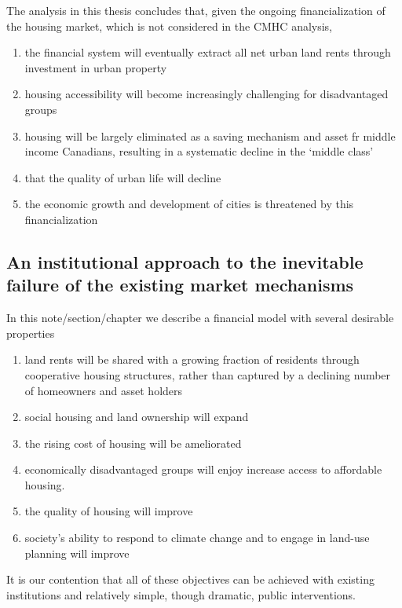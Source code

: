 The analysis in this thesis concludes that, given the ongoing financialization of the housing market, which is not considered in the CMHC analysis,

\begin{enumerate}
\item the financial system will eventually extract all net urban land rents through investment in urban property
\item housing accessibility will become increasingly challenging for disadvantaged groups
\item housing will be largely eliminated as a saving mechanism and asset fr middle income Canadians,  resulting in a systematic decline in the `middle class'
\item that the quality of urban life will decline
\item the economic growth and development of cities is threatened by this financialization
\end{enumerate}



\subsection{An institutional approach to the inevitable failure of the existing market mechanisms}

 In this note/section/chapter we describe a financial model with several desirable properties
 
 \begin{enumerate}
     \item land rents will be shared with a growing fraction of residents through cooperative housing structures, rather than captured by a declining number of homeowners and asset holders
     \item social housing and land ownership will expand
     \item the rising cost of housing will be ameliorated
     \item economically disadvantaged groups will enjoy increase access to affordable housing.
     \item the quality of housing will improve
     \item society's ability to respond to climate change and to engage in land-use planning will improve     
 \end{enumerate}


 It is our contention that all of these objectives can be achieved with existing institutions and relatively simple, though dramatic, public interventions.

